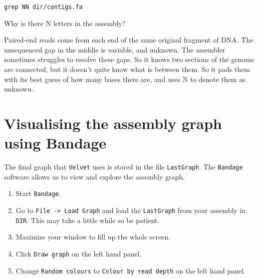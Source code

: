 \begin{steps}
\begin{lstlisting}
grep NN dir/contigs.fa
\end{lstlisting}
\end{steps}

\begin{questions}
Why is there N letters in the assembly? \\
\begin{answer}
Paired-end reads come from each end of the same original fragment of DNA.
The unsequenced gap in the middle is variable, and unknown. The assembler
sometimes struggles to resolve these gaps. So it knows two sections of the
genome are connected, but it doesn't quite know what is between them. So
it pads them with its best guess of how many bases there are, and uses N
to denote them as unknown.
\end{answer}
\end{questions}

\section{Visualising the assembly graph using Bandage}

The final graph that \texttt{Velvet} uses is stored in the file \texttt{LastGraph}.
The \texttt{Bandage} software allows us to view and explore the assembly graph.
\begin{steps}
\begin{enumerate}
\item Start \texttt{Bandage}.
\item Go to \texttt{File -> Load Graph} and load the \texttt{LastGraph} from your assembly in \texttt{DIR}. This may take a little while so be patient.
\item Maximize your window to fill up the whole screen.
\item Click \texttt{Draw graph} on the left hand panel.
\item Change \texttt{Random colours} to \texttt{Colour by read depth} on the left hand panel.
\end{enumerate}
\end{steps}

